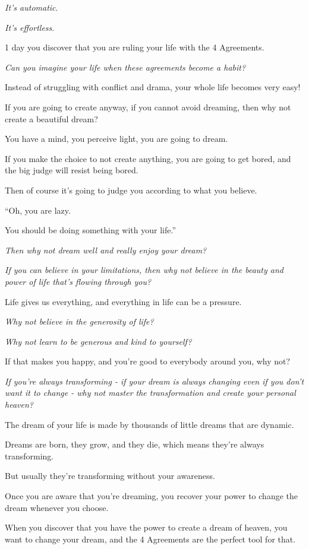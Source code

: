 \documentclass{article}
\numberwithin{equation}{section}
\begin{document}
\textit{It's automatic}.

\textit{It's effortless}.

1 day you discover that you are ruling your life with the 4 Agreements.

\textit{Can you imagine your life when these agreements become a habit?}

Instead of struggling with conflict and drama, your whole life becomes very easy!

%
If you are going to create anyway, if you cannot avoid dreaming, then why not create a beautiful dream?

You have a mind, you perceive light, you are going to dream.

If you make the choice to not create anything, you are going to get bored, and the big judge will resist being bored.

Then of course it's going to judge you according to what you believe.

``Oh, you are lazy.

You should be doing something with your life.''

\textit{Then why not dream well and really enjoy your dream?}

\textit{If you can believe in your limitations, then why not believe in the beauty and power of life that's flowing through you?}

%
Life gives us everything, and everything in life can be a pressure.

\textit{Why not believe in the generosity of life?}

\textit{Why not learn to be generous and kind to yourself?}

If that makes you happy, and you're good to everybody around you, why not?

\textit{If you're always transforming - if your dream is always changing even if you don't want it to change - why not master the transformation and create your personal heaven?}

%
The dream of your life is made by thousands of little dreams that are dynamic.

Dreams are born, they grow, and they die, which means they're always transforming.

But usually they're transforming without your awareness.

Once you are aware that you're dreaming, you recover your power to change the dream whenever you choose.

When you discover that you have the power to create a dream of heaven, you want to change your dream, and the 4 Agreements are the perfect tool for that.
\end{document}
